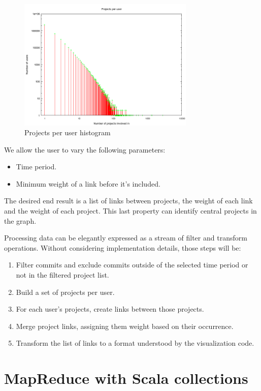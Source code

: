 \documentclass[10pt,a4paper]{article}
\begin{document}
\begin{figure}[htb]
    \centering
    \includegraphics[width=0.75\textwidth]{projects-per-user-histogram}
    \caption{Projects per user histogram}
    \label{fig:projects-per-user-hist}
\end{figure}

We allow the user to vary the following parameters:
\begin{itemize}
    \item Time period.
    \item Minimum weight of a link before it's included.
\end{itemize}
The desired end result is a list of links between projects, the weight of each link and the weight of each project. This last property can identify central projects in the graph.

Processing data can be elegantly expressed as a stream of filter and transform operations. Without considering implementation details, those steps will be:
\begin{enumerate}
    \item Filter commits and exclude commits outside of the selected time period or not in the filtered project list.
    \item Build a set of projects per user.
    \item For each user's projects, create links between those projects.
    \item Merge project links, assigning them weight based on their occurrence.
    \item Transform the list of links to a format understood by the visualization code.
\end{enumerate}

\section{MapReduce with Scala collections}\label{sec:mapreduce}
\end{document}
